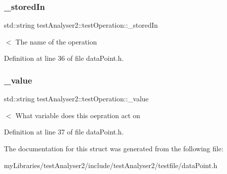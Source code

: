 \subsubsection{\texorpdfstring{\_storedIn}{\_storedIn}}
{\footnotesize\ttfamily std\+::string test\+Analyser2\+::test\+Operation\+::\+\_\+stored\+In}

$<$ The name of the operation 

Definition at line 36 of file data\+Point.\+h.

\mbox{\label{structtestAnalyser2_1_1testOperation_af6f6d9a802cb6dffa1440cfb9d88d0f8}} 
\subsubsection{\texorpdfstring{\_value}{\_value}}
{\footnotesize\ttfamily std\+::string test\+Analyser2\+::test\+Operation\+::\+\_\+value}

$<$ What variable does this oepration act on 

Definition at line 37 of file data\+Point.\+h.



The documentation for this struct was generated from the following file\+:\begin{DoxyCompactItemize}
\item 
my\+Libraries/test\+Analyser2/include/test\+Analyser2/testfile/data\+Point.\+h\end{DoxyCompactItemize}
